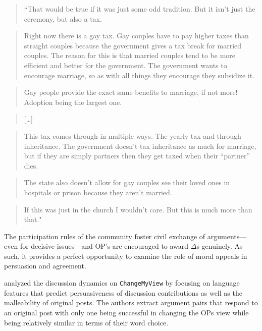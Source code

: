 \begin{quote}
``That would be true if it was just some odd tradition. But it isn't just the ceremony, but also a tax.
\end{quote}

\begin{quote}
Right now there is a gay tax. Gay couples have to pay higher taxes than straight couples because the government gives a tax break for married couples. The reason for this is that married couples tend to be more efficient and better for the government. The government wants to encourage marriage, so as with all things they encourage they subsidize it.
\end{quote}

\begin{quote}
Gay people provide the exact same benefits to marriage, if not more! Adoption being the largest one.
\end{quote}

\begin{quote}
{[}\ldots{}{]}
\end{quote}

\begin{quote}
This tax comes through in multiple ways. The yearly tax and through inheritance. The government doesn't tax inheritance as much for marriage, but if they are simply partners then they get taxed when their ``partner'' dies.
\end{quote}

\begin{quote}
The state also doesn't allow for gay couples see their loved ones in hospitals or prison because they aren't married.
\end{quote}

\begin{quote}
If this was just in the church I wouldn't care. But this is much more than that."
\end{quote}

The participation rules of the community foster civil exchange of arguments---even for decisive issues---and OP's are encouraged to award \(\Delta\)s genuinely. As such, it provides a perfect opportunity to examine the role of moral appeals in persuasion and agreement.

\citet{tan2016winning} analyzed the discussion dynamics on \texttt{ChangeMyView} by focusing on language features that predict persuasiveness of discussion contributions as well as the malleability of original posts. The authors extract argument pairs that respond to an original post with only one being successful in changing the OPs view while being relatively similar in terms of their word choice.

